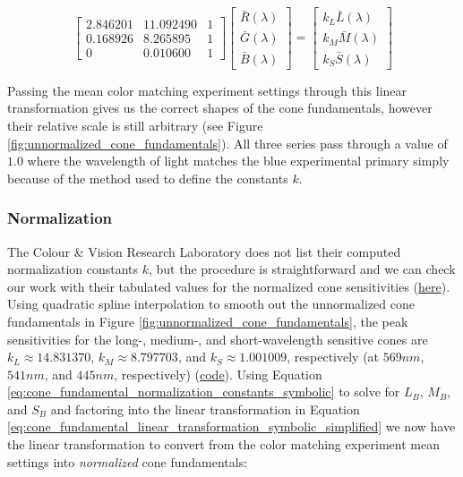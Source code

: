 \documentclass{article}
\begin{document}
\begin{multicols}{2}
\begin{equation}\label{eq:cone_fundamental_linear_transformation} %
    \begin{bmatrix}
        2.846201&11.092490&1\\
        0.168926&8.265895&1\\
        0&0.010600&1
    \end{bmatrix}\begin{bmatrix}
        \bar{R}(\lambda)\\
        \bar{G}(\lambda)\\
        \bar{B}(\lambda)
    \end{bmatrix}=\begin{bmatrix}
        k_L\bar{L}(\lambda)\\
        k_M\bar{M}(\lambda)\\
        k_S\bar{S}(\lambda)
    \end{bmatrix}
\end{equation}

Passing the mean color matching experiment settings through this linear transformation gives us the correct shapes of the cone fundamentals, however their relative scale is still arbitrary (see Figure \ref{fig:unnormalized_cone_fundamentals}).  All three series pass through a value of $1.0$ where the wavelength of light matches the blue experimental primary simply because of the method used to define the constants $k$.

\subsubsection{Normalization} %

The Colour \& Vision Research Laboratory does not list their computed normalization constants $k$, but the procedure is straightforward and we can check our work with their tabulated values for the normalized cone sensitivities (\href{http://www.cvrl.org/cones.htm}{here}).  Using quadratic spline interpolation to smooth out the unnormalized cone fundamentals in Figure \ref{fig:unnormalized_cone_fundamentals}, the peak sensitivities for the long-, medium-, and short-wavelength sensitive cones are $k_L\approx14.831370$, $k_M\approx8.797703$, and $k_S\approx1.001009$, respectively (at $569 nm$, $541 nm$, and $445 nm$, respectively) (\href{https://github.com/kyle-c-mcdermott/visualizing-color-space/blob/main/maths/estimate_cone_fundamental_normalization_constants.py}{code}).  Using Equation \ref{eq:cone_fundamental_normalization_constants_symbolic} to solve for $L_B$, $M_B$, and $S_B$ and factoring into the linear transformation in Equation \ref{eq:cone_fundamental_linear_transformation_symbolic_simplified} we now have the linear transformation to convert from the color matching experiment mean settings into \textit{normalized} cone fundamentals:


\end{multicols}
\end{document}
